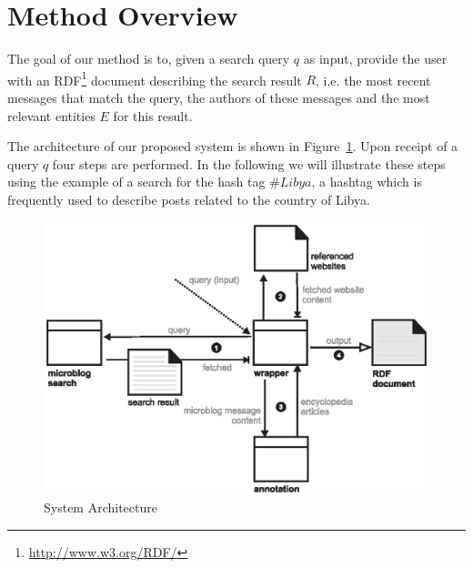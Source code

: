 \documentclass{llncs}
\begin{document}
\section{Method Overview}
\label{sect:method}

The goal of our method is to, given a search query $q$ as input, provide the user with an RDF\footnote{\url{http://www.w3.org/RDF/}} document describing the search result $R$, i.e. the most recent messages that match the query, the authors of these messages and the most relevant entities $E$ for this result.

The architecture of our proposed system is shown in Figure~\ref{fig:arch}. Upon
receipt of a query $q$ four steps are performed. In the following we will illustrate
these steps using the example of a search for the hash tag $\#Libya$, a hashtag
which is frequently used to describe posts related to the country of Libya.

\begin{figure}[htb]
  \centering
  \includegraphics[width=.7\linewidth]{architecture}
  \caption{System Architecture}
  \label{fig:arch}
\end{figure}
\end{document}
